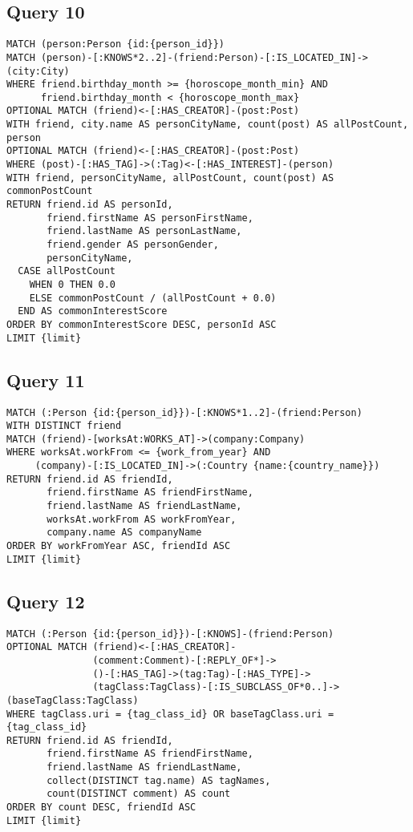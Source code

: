 \subsection{Query 10}

\begin{verbatim}
MATCH (person:Person {id:{person_id}})
MATCH (person)-[:KNOWS*2..2]-(friend:Person)-[:IS_LOCATED_IN]->(city:City)
WHERE friend.birthday_month >= {horoscope_month_min} AND 
      friend.birthday_month < {horoscope_month_max}
OPTIONAL MATCH (friend)<-[:HAS_CREATOR]-(post:Post)
WITH friend, city.name AS personCityName, count(post) AS allPostCount, person
OPTIONAL MATCH (friend)<-[:HAS_CREATOR]-(post:Post)
WHERE (post)-[:HAS_TAG]->(:Tag)<-[:HAS_INTEREST]-(person)
WITH friend, personCityName, allPostCount, count(post) AS commonPostCount
RETURN friend.id AS personId, 
       friend.firstName AS personFirstName, 
       friend.lastName AS personLastName, 
       friend.gender AS personGender, 
       personCityName,
  CASE allPostCount
    WHEN 0 THEN 0.0
    ELSE commonPostCount / (allPostCount + 0.0)
  END AS commonInterestScore
ORDER BY commonInterestScore DESC, personId ASC
LIMIT {limit} 
\end{verbatim}

\subsection{Query 11}

\begin{verbatim}
MATCH (:Person {id:{person_id}})-[:KNOWS*1..2]-(friend:Person)
WITH DISTINCT friend
MATCH (friend)-[worksAt:WORKS_AT]->(company:Company)
WHERE worksAt.workFrom <= {work_from_year} AND 
     (company)-[:IS_LOCATED_IN]->(:Country {name:{country_name}})
RETURN friend.id AS friendId, 
       friend.firstName AS friendFirstName, 
       friend.lastName AS friendLastName, 
       worksAt.workFrom AS workFromYear, 
       company.name AS companyName
ORDER BY workFromYear ASC, friendId ASC
LIMIT {limit}
\end{verbatim}

\subsection{Query 12}

\begin{verbatim}
MATCH (:Person {id:{person_id}})-[:KNOWS]-(friend:Person)
OPTIONAL MATCH (friend)<-[:HAS_CREATOR]-
               (comment:Comment)-[:REPLY_OF*]->
               ()-[:HAS_TAG]->(tag:Tag)-[:HAS_TYPE]->
               (tagClass:TagClass)-[:IS_SUBCLASS_OF*0..]->(baseTagClass:TagClass)
WHERE tagClass.uri = {tag_class_id} OR baseTagClass.uri = {tag_class_id}
RETURN friend.id AS friendId, 
       friend.firstName AS friendFirstName, 
       friend.lastName AS friendLastName, 
       collect(DISTINCT tag.name) AS tagNames,
       count(DISTINCT comment) AS count
ORDER BY count DESC, friendId ASC
LIMIT {limit}
\end{verbatim}

